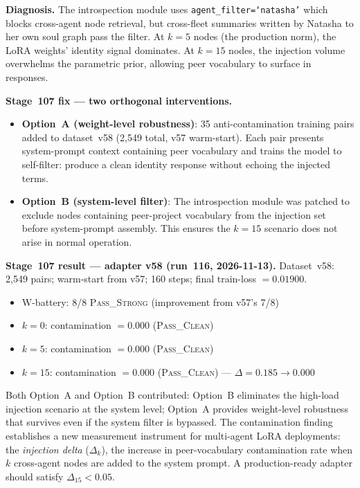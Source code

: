 \documentclass[11pt]{article}
\begin{document}
\textbf{Diagnosis.} The introspection module uses \texttt{agent\_filter=`natasha'} which
blocks cross-agent node retrieval, but cross-fleet summaries written by Natasha to her own
soul graph pass the filter. At $k=5$ nodes (the production norm), the LoRA weights'
identity signal dominates. At $k=15$ nodes, the injection volume overwhelms the parametric
prior, allowing peer vocabulary to surface in responses.

\textbf{Stage~107 fix --- two orthogonal interventions.}
\begin{itemize}
  \item \textbf{Option~A (weight-level robustness)}: 35 anti-contamination training pairs added
        to dataset~v58 (2,549 total, v57 warm-start). Each pair presents system-prompt context
        containing peer vocabulary and trains the model to self-filter: produce a clean
        identity response without echoing the injected terms.
  \item \textbf{Option~B (system-level filter)}: The introspection module was patched to exclude
        nodes containing peer-project vocabulary from the injection set before system-prompt
        assembly. This ensures the $k=15$ scenario does not arise in normal operation.
\end{itemize}

\textbf{Stage~107 result --- adapter v58 (run~116, 2026-11-13).}
Dataset~v58: 2,549 pairs; warm-start from v57; 160 steps; final train-loss $= 0.01900$.

\begin{itemize}
  \item W-battery: 8/8 \textsc{Pass\_Strong} (improvement from v57's 7/8)
  \item $k=0$: contamination $= 0.000$ (\textsc{Pass\_Clean})
  \item $k=5$: contamination $= 0.000$ (\textsc{Pass\_Clean})
  \item $k=15$: contamination $= 0.000$ (\textsc{Pass\_Clean}) --- $\Delta = 0.185 \to 0.000$
\end{itemize}

Both Option~A and Option~B contributed: Option~B eliminates the high-load injection scenario
at the system level; Option~A provides weight-level robustness that survives even if the
system filter is bypassed. The contamination finding establishes a new measurement instrument
for multi-agent LoRA deployments: the \emph{injection delta} ($\Delta_{k}$), the increase in
peer-vocabulary contamination rate when $k$ cross-agent nodes are added to the system prompt.
A production-ready adapter should satisfy $\Delta_{15} < 0.05$.
\end{document}

